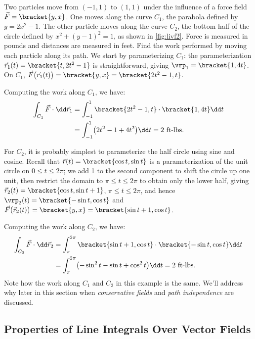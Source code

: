 \begin{example}\label{ex_livf2}%
Two particles move from $(-1,1)$ to $(1,1)$ under the influence of a force field $\vec F =\bracket{y,x}$. One moves along the curve $C_1$, the parabola defined by $y = 2x^2-1$. The other particle moves along the curve $C_2$, the bottom half of the circle defined by $x^2+(y-1)^2=1$, as shown in \autoref{fig:livf2}. Force is measured in pounds and distances are measured in feet. Find the work performed by moving each particle along its path.
\solution
We start by parameterizing $C_1$: the parameterization $\vec r_1(t) =\bracket{t,2t^2-1}$ is straightforward, giving $\vrp_1 =\bracket{1,4t}$. On $C_1$, $\vec F\bigl(\vec r_1(t)\bigr) =\bracket{y,x}=\bracket{2t^2-1,t}$.

Computing the work along $C_1$, we have:
\begin{align*}
	\int_{C_1} \vec F\cdot\dd\vec r_1
	& = \int_{-1}^1\bracket{2t^2-1,t}\cdot\bracket{1,4t}\dd t \\
	&= \int_{-1}^1 \bigl(2t^2-1+4t^2\bigr)\dd t = 2 \text{ ft-lbs}.
\end{align*}

For $C_2$, it is probably simplest to parameterize the half circle using sine and cosine. Recall that $\vec r(t) =\bracket{\cos t,\sin t}$ is a parameterization of the unit circle on $0\leq t\leq 2\pi$; we add 1 to the second component to shift the circle up one unit, then restrict the domain to $\pi\leq t\leq 2\pi$  to obtain only the lower half, giving $\vec r_2(t) =\bracket{\cos t,\sin t+1}$, $\pi\leq t\leq 2\pi$, and hence $\vrp_2(t) =\bracket{-\sin t,\cos t}$ and $\vec F\bigl(\vec r_2(t)\bigr) =\bracket{y,x}=\bracket{\sin t+1,\cos t}$.

Computing the work along $C_2$, we have:
\begin{align*}
	\int_{C_2} \vec F\cdot\dd\vec r_2
	& = \int_{\pi}^{2\pi}\bracket{\sin t+1,\cos t}\cdot\bracket{-\sin t,\cos t}\dd t \\
	&= \int_{\pi}^{2\pi} \bigl(-\sin^2t-\sin t+\cos^2t\bigr)\dd t = 2 \text{ ft-lbs}.
\end{align*}
Note how the work along $C_1$ and $C_2$ in this example is the same. We'll address why later in this section when \emph{conservative fields} and \emph{path independence} are discussed.
\end{example}

\subsection{Properties of Line Integrals Over Vector Fields}

